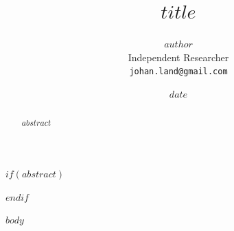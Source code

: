 \documentclass[11pt]{article}
\title{$title$}
\author{$author$ \\ Independent Researcher \\ \texttt{johan.land@gmail.com}}
\date{$date$}
\date{}
\begin{document}
\maketitle

$if(abstract)$
\begin{abstract}
$abstract$
\end{abstract}
$endif$

$body$
\end{document}
